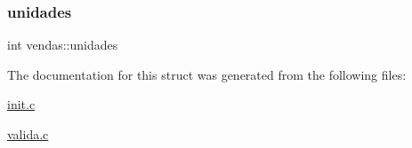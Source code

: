 \subsubsection{\texorpdfstring{unidades}{unidades}}
{\footnotesize\ttfamily int vendas\+::unidades}



The documentation for this struct was generated from the following files\+:\begin{DoxyCompactItemize}
\item 
\mbox{\hyperlink{init_8c}{init.\+c}}\item 
\mbox{\hyperlink{valida_8c}{valida.\+c}}\end{DoxyCompactItemize}
